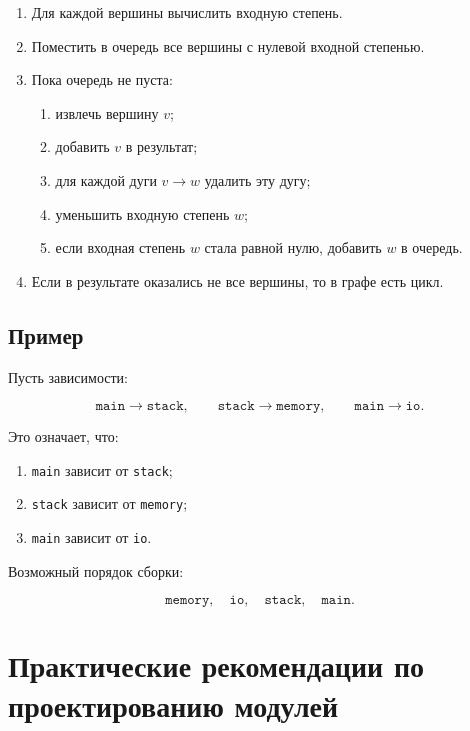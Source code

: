 \documentclass[12pt,a4paper]{article}
\begin{document}
\begin{enumerate}
  \item Для каждой вершины вычислить входную степень.
  \item Поместить в очередь все вершины с нулевой входной степенью.
  \item Пока очередь не пуста:
  \begin{enumerate}
    \item извлечь вершину $v$;
    \item добавить $v$ в результат;
    \item для каждой дуги $v \rightarrow w$ удалить эту дугу;
    \item уменьшить входную степень $w$;
    \item если входная степень $w$ стала равной нулю, добавить $w$ в очередь.
  \end{enumerate}
  \item Если в результате оказались не все вершины, то в графе есть цикл.
\end{enumerate}

\subsection*{Пример}

Пусть зависимости:

\[
\texttt{main} \rightarrow \texttt{stack},
\qquad
\texttt{stack} \rightarrow \texttt{memory},
\qquad
\texttt{main} \rightarrow \texttt{io}.
\]

Это означает, что:
\begin{enumerate}
  \item \texttt{main} зависит от \texttt{stack};
  \item \texttt{stack} зависит от \texttt{memory};
  \item \texttt{main} зависит от \texttt{io}.
\end{enumerate}

Возможный порядок сборки:

\[
\texttt{memory},\quad \texttt{io},\quad \texttt{stack},\quad \texttt{main}.
\]

\section{Практические рекомендации по проектированию модулей}
\end{document}
